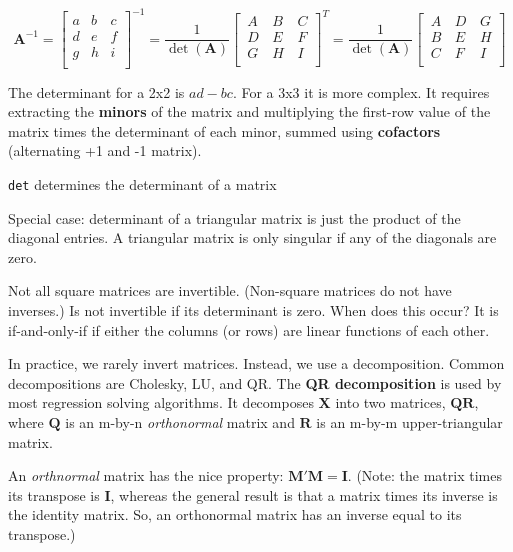 \documentclass[a4paper,12pt]{article}
\newcommand{\matr}[1]{\mathbf{#1}}
\begin{document}
\begin{equation*}
\mathbf{A}^{-1} = \begin{bmatrix}
a & b & c\\ d & e & f \\ g & h & i\\
\end{bmatrix}^{-1} =
\frac{1}{\det(\mathbf{A})} \begin{bmatrix}
\, A & \, B & \,C \\ \, D & \, E & \, F \\ \, G & \, H & \, I\\
\end{bmatrix}^T =
\frac{1}{\det(\mathbf{A})} \begin{bmatrix}
\, A & \, D & \,G \\ \, B & \, E & \,H \\ \, C & \,F & \, I\\
\end{bmatrix}
\end{equation*}

The determinant for a 2x2 is $ad-bc$. For a 3x3 it is more complex. It requires extracting the \textbf{minors} of the matrix and multiplying the first-row value of the matrix times the determinant of each minor, summed using \textbf{cofactors} (alternating +1 and -1 matrix).

\texttt{det} determines the determinant of a matrix

Special case: determinant of a triangular matrix is just the product of the diagonal entries. A triangular matrix is only singular if any of the diagonals are zero.

Not all square matrices are invertible. (Non-square matrices do not have inverses.) Is not invertible if its determinant is zero. When does this occur? It is if-and-only-if if either the columns (or rows) are linear functions of each other.


In practice, we rarely invert matrices. Instead, we use a decomposition. Common decompositions are Cholesky, LU, and QR. The \textbf{QR decomposition} is used by most regression solving algorithms. It decomposes $\matr{X}$ into two matrices, $\matr{Q}\matr{R}$, where $\matr{Q}$ is an m-by-n \textit{orthonormal} matrix and $\matr{R}$ is an m-by-m upper-triangular matrix.

An \textit{orthnormal} matrix has the nice property: $\matr{M}'\matr{M} = \matr{I}$. (Note: the matrix times its transpose is $\matr{I}$, whereas the general result is that a matrix times its inverse is the identity matrix. So, an orthonormal matrix has an inverse equal to its transpose.)
\end{document}
